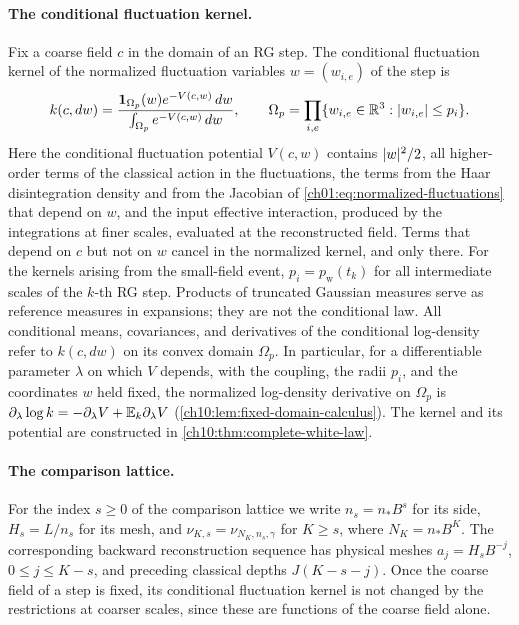 \paragraph{The conditional fluctuation kernel.}
Fix a coarse field $c$ in the domain of an RG step. The conditional fluctuation kernel of the normalized fluctuation variables $w=(w_{i,e})$ of the step is
\begin{equation}\label{ch01:eq:complete-white-kernel}
 k(c,dw)=\frac{\mathbf 1_{\Omega_p}(w)e^{-V(c,w)}\,dw}{\int_{\Omega_p}e^{-V(c,w)}\,dw},
 \qquad \Omega_p=\prod_{i,e}\{w_{i,e}\in\mathbb R^3:\lvert w_{i,e}\rvert\le p_i\}.
\end{equation}
Here the conditional fluctuation potential $V(c,w)$ contains $\lvert w\rvert^2/2$, all higher-order terms of the classical action in the fluctuations, the terms from the Haar disintegration density and from the Jacobian of \eqref{ch01:eq:normalized-fluctuations} that depend on $w$, and the input effective interaction, produced by the integrations at finer scales, evaluated at the reconstructed field. Terms that depend on $c$ but not on $w$ cancel in the normalized kernel, and only there. For the kernels arising from the small-field event, $p_i=p_{\mathrm w}(t_k)$ for all intermediate scales of the $k$-th RG step. Products of truncated Gaussian measures serve as reference measures in expansions; they are not the conditional law. All conditional means, covariances, and derivatives of the conditional log-density refer to $k(c,dw)$ on its convex domain $\Omega_p$. In particular, for a differentiable parameter $\lambda$ on which $V$ depends, with the coupling, the radii $p_i$, and the coordinates $w$ held fixed, the normalized log-density derivative on $\Omega_p$ is $\partial_\lambda\log k=-\partial_\lambda V+\mathbb E_{k}\partial_\lambda V$ (\cref{ch10:lem:fixed-domain-calculus}). The kernel and its potential are constructed in \cref{ch10:thm:complete-white-law}.

\paragraph{The comparison lattice.}
For the index $s\ge0$ of the comparison lattice we write $n_s=n_*B^s$ for its side, $H_s=L/n_s$ for its mesh, and $\nu_{K,s}=\nu_{N_K,n_s,\gamma}$ for $K\ge s$, where $N_K=n_*B^K$. The corresponding backward reconstruction sequence has physical meshes $a_j=H_sB^{-j}$, $0\le j\le K-s$, and preceding classical depths $J(K-s-j)$. Once the coarse field of a step is fixed, its conditional fluctuation kernel is not changed by the restrictions at coarser scales, since these are functions of the coarse field alone.


